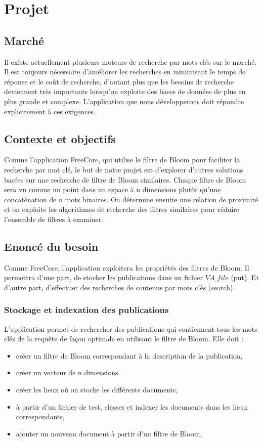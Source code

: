 \chapter{Projet}
\section{Marché}
		Il existe actuellement plusieurs moteurs de recherche par mots clés sur le marché. Il est toujours nécessaire d’améliorer les recherches en minimisant le temps de réponse et le coût de recherche, d’autant plus que les besoins de recherche deviennent très importants lorsqu’on exploite des bases de données de plus en plus grande et complexe. L’application que nous développerons doit répondre explicitement à ces exigences.
		
	\section{Contexte et objectifs}
		Comme l’application FreeCore\cite{freecore}, qui utilise le filtre de Bloom pour faciliter la recherche par mot clé, le but de notre projet est d'explorer d’autres solutions basées sur une recherche de filtre de Bloom similaires.  Chaque filtre  de  Bloom  sera vu  comme  un  point  dans  un  espace à n dimensions  plutôt  qu'une  concaténation de  n mots binaires. On détermine ensuite une relation de proximité et on exploite les algorithmes de recherche des filtres similaires pour réduire l'ensemble de filtres à examiner.
		
	\section{Enoncé du besoin}
		Comme FreeCore, l’application exploitera les propriétés des filtres de Bloom. Il  permettra d’une part, de stocker les publications dans un fichier $VA\_file$ (put). Et d’autre part, d’effectuer des recherches de contenus par mots clés (search).
	\subsection{Stockage et indexation des publications}
	L’application permet de rechercher des publications qui contiennent tous les mots clés de la requête de façon optimale en utilisant le filtre de Bloom. Elle doit :
	\begin{itemize}
	
	\item créer un filtre de Bloom correspondant à la description de la publication, 
	\item créer un vecteur de n dimensions.
	\item créer les lieux où on stocke les différents documents,
	\item à partir d'un fichier de test, classer et indexer les documents dans les lieux correspondants,		
	\item ajouter un nouveau document à partir d'un filtre de Bloom,				\end{itemize}
	
